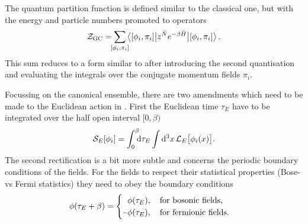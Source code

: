 The quantum partition function is defined similar to the classical one, but with
the energy and particle numbers promoted to operators
%
\begin{equation}
  \mathcal{Z}_{\text{GC}} = \sum_{\mathclap{[\phi_i, \pi_i]}}
  \big\langle [\phi_i, \pi_i] \big|
    z^{\hat{N}} e^{-\beta \hat{H}} \big| [\phi_i, \pi_i] \big\rangle \,.
\end{equation}
%
This sum reduces to a form similar to  after introducing
the second quantisation and evaluating the integrals over the conjugate momentum
fields $\pi_i$.


Focussing on the canonical ensemble, there are two amendments which need to be
made to the Euclidean action in . First the Euclidean time
$\tau_E$ have to be integrated over the half open interval $[0, \beta)$
%
\begin{equation}
  \mathcal{S}_E[\phi_i] = \int_{\mathrlap{0}}^{\mathrlap{\beta}} \mathrm{d} \tau_E \int \mathrm{d}^3 x \,
    \mathcal{L}_E\big[\phi_i(x)\big].
\end{equation}
%
The second rectification is a bit more subtle and concerns the periodic boundary
conditions of the fields. For the fields to respect their statistical properties
(Bose- vs Fermi statistics) they need to obey the boundary conditions
%
\begin{equation} \label{eq:boundary-conditions}
  \phi(\tau_E + \beta) = \begin{cases}
    \hphantom{\minus}\phi(\tau_E), \hskip1em \text{for bosonic fields}, \\
    \minus\phi(\tau_E), \hskip1em \text{for fermionic fields}.
  \end{cases}
\end{equation}

